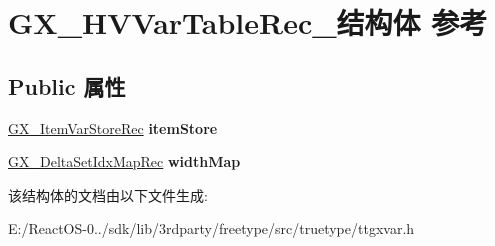 \hypertarget{struct_g_x___h_v_var_table_rec__}{}\section{G\+X\+\_\+\+H\+V\+Var\+Table\+Rec\+\_\+结构体 参考}
\label{struct_g_x___h_v_var_table_rec__}
\subsection*{Public 属性}
\begin{DoxyCompactItemize}
\item 
\mbox{\label{struct_g_x___h_v_var_table_rec___a484cb8a1c0e9e5761683f57b4592ae97}} 
\hyperlink{struct_g_x___item_var_store_rec__}{G\+X\+\_\+\+Item\+Var\+Store\+Rec} {\bfseries item\+Store}
\item 
\mbox{\label{struct_g_x___h_v_var_table_rec___acfcff77d5f77c233a5f0fc28de5f036e}} 
\hyperlink{struct_g_x___delta_set_idx_map_rec__}{G\+X\+\_\+\+Delta\+Set\+Idx\+Map\+Rec} {\bfseries width\+Map}
\end{DoxyCompactItemize}


该结构体的文档由以下文件生成\+:\begin{DoxyCompactItemize}
\item 
E\+:/\+React\+O\+S-\/0../sdk/lib/3rdparty/freetype/src/truetype/ttgxvar.\+h\end{DoxyCompactItemize}
